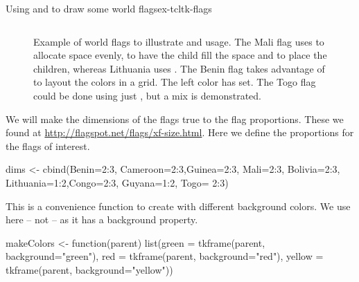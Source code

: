 \begin{example}{Using  and  to draw some world flags}{ex-tcltk-flags}
\begin{figure}
\begin{tabular}{cc}
  \end{tabular}
  \caption{Example of world flags to illustrate  and  usage. The Mali flag uses  to allocate space evenly,  to have the child fill the space and  to place the children, whereas Lithuania uses . The Benin flag takes advantage of  to layout the colors in a grid. The left color has  set. The Togo flag could be done using just , but a mix is demonstrated.}
  \label{fig:tcltk-flags}
\end{figure}



We will make the dimensions of the flags true to the flag proportions. These we found at \url{http://flagspot.net/flags/xf-size.html}. Here we define the proportions for the flags of interest.
\begin{Schunk}
\begin{Sinput}
 dims <- cbind(Benin=2:3, Cameroon=2:3,Guinea=2:3, Mali=2:3,
               Bolivia=2:3, Lithuania=1:2,Congo=2:3, Guyana=1:2,
               Togo= 2:3)
\end{Sinput}
\end{Schunk}

This is a convenience function to create  with different background colors. We use  here -- not  -- as it has a background property.
\begin{Schunk}
\begin{Sinput}
 makeColors <- function(parent)
   list(green  = tkframe(parent, background="green"),
        red    = tkframe(parent, background="red"),
        yellow = tkframe(parent, background="yellow"))
\end{Sinput}
\end{Schunk}


\end{example}
